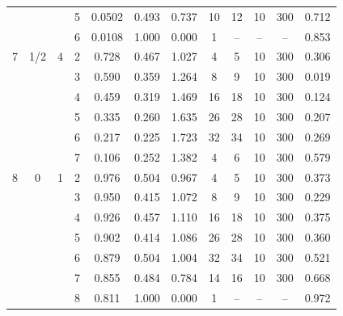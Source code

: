 \documentclass[12pt]{article}
\begin{document}
\begin{table}
\begin{ruledtabular}
\begin{tabular}{cccccccccccc}
 & &  & 5 & 0.0502 & 0.493 & 0.737 & 10 & 12 & 10 & 300 & 0.712 \\
 & &  & 6 & 0.0108 & 1.000 & 0.000 & 1 & -- & -- & -- & 0.853 \\
\hline
7 & 1/2 & 4 & 2 & 0.728 & 0.467 & 1.027 & 4 & 5 & 10 & 300 & 0.306 \\
 & &  & 3 & 0.590 & 0.359 & 1.264 & 8 & 9 & 10 & 300 & 0.019 \\
 & &  & 4 & 0.459 & 0.319 & 1.469 & 16 & 18 & 10 & 300 & 0.124 \\
 & &  & 5 & 0.335 & 0.260 & 1.635 & 26 & 28 & 10 & 300 & 0.207 \\
 & &  & 6 & 0.217 & 0.225 & 1.723 & 32 & 34 & 10 & 300 & 0.269 \\
 & &  & 7 & 0.106 & 0.252 & 1.382 & 4 & 6 & 10 & 300 & 0.579 \\
\hline
8 & 0 & 1 & 2 & 0.976 & 0.504 & 0.967 & 4 & 5 & 10 & 300 & 0.373 \\
 & &  & 3 & 0.950 & 0.415 & 1.072 & 8 & 9 & 10 & 300 & 0.229 \\
 & &  & 4 & 0.926 & 0.457 & 1.110 & 16 & 18 & 10 & 300 & 0.375 \\
 & &  & 5 & 0.902 & 0.414 & 1.086 & 26 & 28 & 10 & 300 & 0.360 \\
 & &  & 6 & 0.879 & 0.504 & 1.004 & 32 & 34 & 10 & 300 & 0.521 \\
 & &  & 7 & 0.855 & 0.484 & 0.784 & 14 & 16 & 10 & 300 & 0.668 \\
 & &  & 8 & 0.811 & 1.000 & 0.000 & 1 & -- & -- & -- & 0.972
\end{tabular}
\end{ruledtabular}
\end{table}
\end{document}
